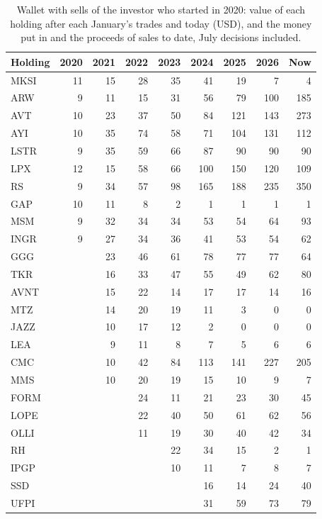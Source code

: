 \documentclass[11pt,a4paper]{article}
\begin{document}
{\small
\begin{longtable}{l r r r r r r r r }
\caption{Wallet with sells of the investor who started in 2020: value of each holding after each January's trades and today (USD), and the money put in and the proceeds of sales to date, July decisions included.}\label{tab:contents}\\
\hline
Holding & 2020 & 2021 & 2022 & 2023 & 2024 & 2025 & 2026 & Now \\
\hline
\endhead
MKSI & 11 & 15 & 28 & 35 & 41 & 19 & 7 & 4 \\
ARW & 9 & 11 & 15 & 31 & 56 & 79 & 100 & 185 \\
AVT & 10 & 23 & 37 & 50 & 84 & 121 & 143 & 273 \\
AYI & 10 & 35 & 74 & 58 & 71 & 104 & 131 & 112 \\
LSTR & 9 & 35 & 59 & 66 & 87 & 90 & 90 & 90 \\
LPX & 12 & 15 & 58 & 66 & 100 & 150 & 120 & 109 \\
RS & 9 & 34 & 57 & 98 & 165 & 188 & 235 & 350 \\
GAP & 10 & 11 & 8 & 2 & 1 & 1 & 1 & 1 \\
MSM & 9 & 32 & 34 & 34 & 53 & 54 & 64 & 93 \\
INGR & 9 & 27 & 34 & 36 & 41 & 53 & 54 & 62 \\
GGG &  & 23 & 46 & 61 & 78 & 77 & 77 & 64 \\
TKR &  & 16 & 33 & 47 & 55 & 49 & 62 & 80 \\
AVNT &  & 15 & 22 & 14 & 17 & 17 & 14 & 16 \\
MTZ &  & 14 & 20 & 19 & 11 & 3 & 0 & 0 \\
JAZZ &  & 10 & 17 & 12 & 2 & 0 & 0 & 0 \\
LEA &  & 9 & 11 & 8 & 7 & 5 & 6 & 6 \\
CMC &  & 10 & 42 & 84 & 113 & 141 & 227 & 205 \\
MMS &  & 10 & 20 & 19 & 15 & 10 & 9 & 7 \\
FORM &  &  & 24 & 11 & 21 & 23 & 30 & 45 \\
LOPE &  &  & 22 & 40 & 50 & 61 & 62 & 56 \\
OLLI &  &  & 11 & 19 & 30 & 40 & 42 & 34 \\
RH &  &  &  & 22 & 34 & 15 & 2 & 1 \\
IPGP &  &  &  & 10 & 11 & 7 & 8 & 7 \\
SSD &  &  &  &  & 16 & 14 & 24 & 40 \\
UFPI &  &  &  &  & 31 & 59 & 73 & 79 \\

\end{longtable}}
\end{document}
